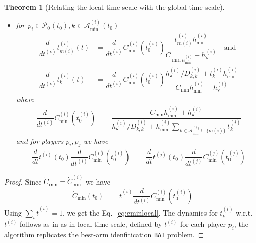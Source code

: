 \documentclass{article}
\newtheorem{theorem}{Theorem}
\begin{document}
\begin{theorem}[Relating the local time scale with the global time scale]
\begin{itemize}
    \item for  $p_i\in \mathcal{P}_{0}(t_0), k\in\mathcal{A}^{(i)}_{\min}(t_0)$
\begin{align*}
     \dfrac{d}{dt^{(i)}}t^{(i)}_{m(i)}(t) &= \dfrac{d}{dt^{(i)}}C^{(i)}_{\min}(t_0^{(i)})\dfrac{t^{(i)}_{m(i)}h^{(i)}_{\min}}{C_{\min h^{(i)}_{\min}}+h^{(i)}_{\texttt{w}}}\quad\text{and}\\ 
     \dfrac{d}{dt^{(i)}}t^{(i)}_{k}(t)&= \dfrac{d}{dt^{(i)}}C^{(i)}_{\min}(t_0^{(i)})\dfrac{h^{(i)}_{\texttt{w}}/D^{(i)}_{k,k}+t^{(i)}_k h^{(i)}_{\min}}{{C_{\min} h^{(i)}_{\min}}+h^{(i)}_{\texttt{w}}}
\end{align*}
where 
\begin{align*}
     \dfrac{d}{dt^{(i)}}C^{(i)}_{\min}(t_0^{(i)})&= \dfrac{{C_{\min} h^{(i)}_{\min}}+h^{(i)}_{\texttt{w}}}{h^{(i)}_{\texttt{w}}/D^{(i)}_{k,k}+ h^{(i)}_{\min}\sum_{k\in\mathcal{A}^{(i)}_{\min}\cup \{m(i)\}}t^{(i)}_k}
\end{align*}
and for players $p_i,p_j$ we have
\begin{align*}
    \dfrac{d}{dt}t^{(i)}(t_0)\dfrac{d}{dt^{(i)}}C^{(i)}_{\min}(t_0^{(i)}) &= \dfrac{d}{dt}t^{(j)}(t_0)\dfrac{d}{dt^{(j)}}C^{(j)}_{\min}(t_0^{(j)})
\end{align*}

\end{itemize}
\end{theorem}

\begin{proof}
    Since $\dot{C}_{\min}=\dot{C}^{(i)}_{\min}$ we have
    \begin{align*}
   \dot{C}_{\min}(t_0) &= \dot{t}^{(i)}\dfrac{d}{dt^{(i)}}C^{(i)}_{\min}(t_0^{(i)})
\end{align*}
Using $\sum_i\dot{t}^{(i)}=1$, we get the Eq.~\ref{eq:cminlocal}. The dynamics for $t^{(i)}_k$ w.r.t. $t^{(i)}$ follows as in \cite{bandyopadhyay2024optimal} as in local time scale, defined by $t^{(i)}$ for each player $p_i$, the algorithm replicates the best-arm idenfitication \texttt{BAI} problem.
\end{proof}
\end{document}
